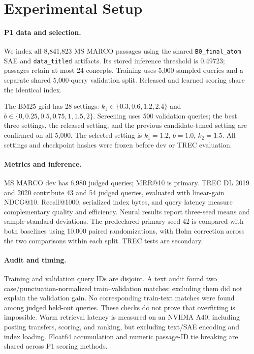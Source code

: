 \section{Experimental Setup}
\paragraph{P1 data and selection.}
We index all 8,841,823 MS MARCO passages using the shared
\texttt{B0\_final\_atom} SAE and \texttt{data\_titled} artifacts. Its stored
inference threshold is 0.49723; passages retain at most 24 concepts.
Training uses 5,000 sampled queries and a separate shared 5,000-query validation
split. Released and learned scoring share the identical index.

The BM25 grid has 28 settings: $k_1\in\{0.3,0.6,1.2,2.4\}$ and
$b\in\{0,0.25,0.5,0.75,1,1.5,2\}$. Screening uses 500 validation queries;
the best three settings, the released setting, and the previous candidate-tuned
setting are confirmed on all 5,000. The selected setting is
$k_1=1.2$, $b=1.0$, $k_2=1.5$. All settings and checkpoint hashes were frozen
before dev or TREC evaluation.

\paragraph{Metrics and inference.}
MS MARCO dev has 6,980 judged queries; MRR@10 is primary. TREC DL 2019 and
2020 contribute 43 and 54 judged queries, evaluated with linear-gain NDCG@10.
Recall@1000, serialized index bytes, and query latency measure complementary
quality and efficiency. Neural results report three-seed means and sample
standard deviations. The predeclared primary seed 42 is compared with both
baselines using 10,000 paired randomizations, with Holm correction across
the two comparisons within each split. TREC tests are secondary.

\paragraph{Audit and timing.}
Training and validation query IDs are disjoint. A text audit found two
case/punctuation-normalized train--validation matches; excluding them did not
explain the validation gain. No corresponding train-text matches were found
among judged held-out queries. These checks do not prove that overfitting is
impossible. Warm retrieval latency is measured on an NVIDIA A40, including
posting transfers, scoring, and ranking, but excluding text/SAE encoding and
index loading. Float64 accumulation and numeric passage-ID tie breaking are
shared across P1 scoring methods.
